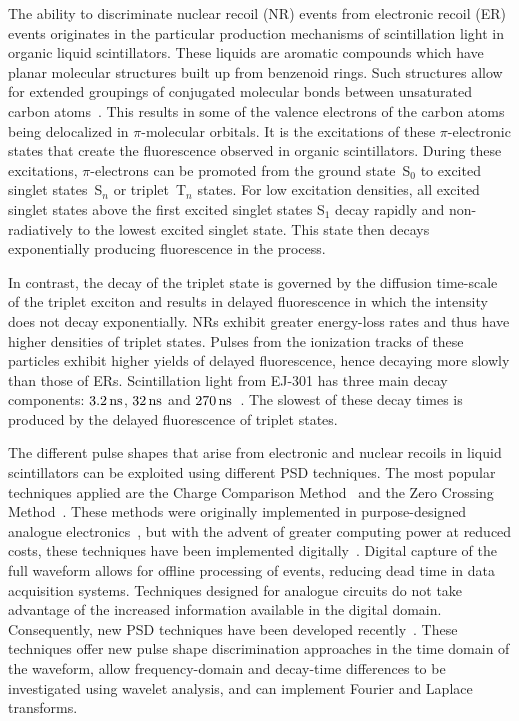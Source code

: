 The ability to discriminate nuclear recoil (NR) events from electronic recoil (ER) events originates in the particular production mechanisms of scintillation light in organic liquid scintillators. These liquids are aromatic compounds which have planar molecular structures built up from benzenoid rings. Such structures allow for extended groupings of conjugated molecular bonds between unsaturated carbon atoms~\cite{Brooks:1979}. This results in some of the valence electrons of the carbon atoms being delocalized in $\pi$-molecular orbitals. It is the excitations of these $\pi$-electronic states that create the fluorescence observed in organic scintillators. During these excitations, $\pi$-electrons can be promoted from the ground state~S$_0$ to excited singlet states~S$_n$ or triplet~T$_n$ states. For low excitation densities, all excited singlet states above the first excited singlet states S$_1$ decay rapidly and non-radiatively to the lowest excited singlet state. This state then decays exponentially producing fluorescence in the process.

In contrast, the decay of the triplet state is governed by the diffusion time-scale of the triplet exciton and results in delayed fluorescence in which the intensity does not decay exponentially. NRs exhibit greater energy-loss rates and thus have higher densities of triplet states. Pulses from the ionization tracks of these particles exhibit higher yields of delayed fluorescence, hence decaying more slowly than those of ERs. Scintillation light from EJ-301 has three main decay components: $3.2\,\mathrm{ns}$, $32\,\mathrm{ns}$ and $270\,\mathrm{ns}$~\cite{Kuchnir:1968}. The slowest of these decay times is produced by the delayed fluorescence of triplet states.

The different pulse shapes that arise from electronic and nuclear recoils in liquid scintillators can be exploited using different PSD techniques. The most popular techniques applied are the Charge Comparison Method~\cite{Brooks:1959} and the Zero Crossing Method~\cite{Alexander:1961}. These methods were originally implemented in purpose-designed analogue electronics~\cite{Adams:1978}, but with the advent of greater computing power at reduced costs, these techniques have been implemented digitally~\cite{Kaschuck:2005, Cester:2014, Liao:2014}. Digital capture of the full waveform allows for offline processing of events, reducing dead time in data acquisition systems. Techniques designed for analogue circuits do not take advantage of the increased information available in the digital domain. Consequently, new PSD techniques have been developed recently~\cite{DMellow:2007, Gamage:2011, Yousefi:2009}. These techniques offer new pulse shape discrimination approaches in the time domain of the waveform, allow frequency-domain and decay-time differences to be investigated using wavelet analysis, and can implement Fourier and Laplace transforms.

